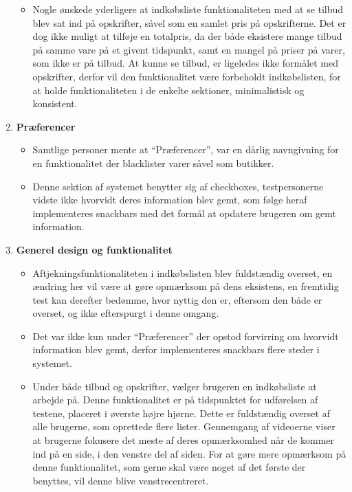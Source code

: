\begin{enumerate}
\begin{itemize}
   								  \item Nogle ønskede yderligere at indkøbsliste funktionaliteten med at se tilbud blev sat ind på opskrifter, såvel som en samlet pris på opskrifterne.
   								  Det er dog ikke muligt at tilføje en totalpris, da der både eksistere mange tilbud på samme vare på et givent tidspunkt, samt en mangel på priser på varer, som ikke er på tilbud.
   								  At kunne se tilbud, er ligeledes ikke formålet med opskrifter, derfor vil den funktionalitet være forbeholdt indkøbslisten, for at holde funktionaliteten i de enkelte sektioner, minimalistisk og konsistent.
   							   \end{itemize}
   \item \textbf{Præferencer}\begin{itemize}
   								  \item Samtlige personer mente at ``Præferencer'', var en dårlig navngivning for en funktionalitet der blacklister varer såvel som butikker.
   								  
   								  \item Denne sektion af systemet benytter sig af checkboxes, testpersonerne vidste ikke hvorvidt deres information blev gemt, som følge heraf implementeres snackbars med det formål at opdatere brugeren om gemt information.
   							   \end{itemize}
   \item \textbf{Generel design og funktionalitet}\begin{itemize}
   								  \item Aftjekningsfunktionaliteten i indkøbslisten blev fuldstændig overset, en ændring her vil være at gøre opmærksom på dens eksistens, en fremtidig test kan derefter bedømme, hvor nyttig den er, eftersom den både er overset, og ikke efterspurgt i denne omgang.
   								  \item Det var ikke kun under ``Præferencer'' der opstod forvirring om hvorvidt information blev gemt, derfor implementeres snackbars flere steder i systemet.
   								  \item Under både tilbud og opskrifter, vælger brugeren en indkøbsliste at arbejde på.
   								  Denne funktionalitet er på tidspunktet for udførelsen af testene, placeret i øverste højre hjørne.
   								  Dette er fuldstændig overset af alle brugerne, som oprettede flere lister.
   								  Gennemgang af videoerne viser at brugerne fokusere det meste af deres opmærksomhed når de kommer ind på en side, i den venstre del af siden.
   								  For at gøre mere opmærksom på denne funktionalitet, som gerne skal være noget af det første der benyttes, vil denne blive venstrecentreret.
   							   \end{itemize}
\end{enumerate}

